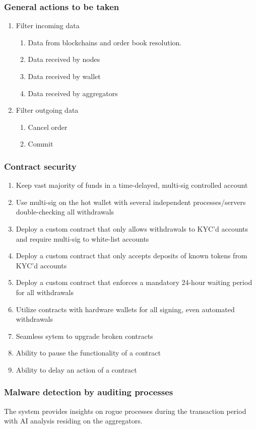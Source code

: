 \documentclass[]{article}
\begin{document}
	\subsubsection{General actions to be taken}
		\begin{enumerate}	
		\item{Filter incoming data} 
		\begin{enumerate}
			\item Data from blockchains and order book resolution.
			\item Data received by nodes
			\item Data received by wallet
			\item Data received by aggregators
		\end{enumerate}
		\item {Filter outgoing data}
		\begin{enumerate}
			\item Cancel order
			\item Commit
		\end{enumerate}
	\end{enumerate}
		\subsubsection{Contract security}
		\begin{enumerate}
		\item Keep vast majority of funds in a time-delayed, multi-sig controlled account
		\item Use multi-sig on the hot wallet with several independent processes/servers double-checking all withdrawals
		\item Deploy a custom contract that only allows withdrawals to KYC'd accounts and require multi-sig to white-list accounts
		\item Deploy a custom contract that only accepts deposits of known tokens from KYC'd accounts
		\item Deploy a custom contract that enforces a mandatory 24-hour waiting period for all withdrawals
		\item Utilize contracts with hardware wallets for all signing, even automated withdrawals
		\item Seamless sytem to upgrade broken contracts
		\item Ability to pause the functionality of a contract 
		\item Ability to delay an action of a contract	
		\end{enumerate}
		\subsubsection{Malware detection by auditing processes}
		The system provides insights on rogue processes during the transaction period with AI analysis residing on the aggregators. 
\end{document}
